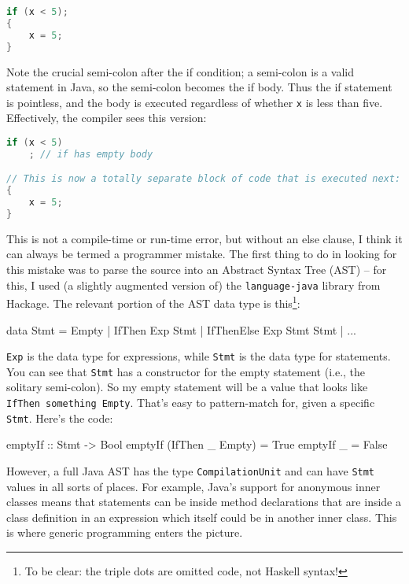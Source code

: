 \documentclass{tmr}
\begin{document}
\begin{lstlisting}[language=java]
if (x < 5);
{
    x = 5;
}
\end{lstlisting}

Note the crucial semi-colon after the if condition; a semi-colon is a valid statement in Java, so the semi-colon becomes the if body.  Thus the if statement is pointless, and the body is executed regardless of whether \lstinline|x| is less than five.  Effectively, the compiler sees this version:

\begin{lstlisting}[language=java]
if (x < 5)
    ; // if has empty body

// This is now a totally separate block of code that is executed next:
{
    x = 5;
}
\end{lstlisting}

This is not a compile-time or run-time error, but without an else clause, I think it can always be termed a programmer mistake.  The first thing to do in looking for this mistake was to parse the source into an Abstract Syntax Tree (AST) -- for this, I used (a slightly augmented version of) the \texttt{language-java} library from Hackage.  The relevant portion of the AST data type is this\footnote{To be clear: the triple dots are omitted code, not Haskell syntax!}:

\begin{code}
data Stmt = Empty | IfThen Exp Stmt | IfThenElse Exp Stmt Stmt | ...
\end{code}

\lstinline|Exp| is the data type for expressions, while \lstinline|Stmt| is the data type for statements.  You can see that \lstinline|Stmt| has a constructor for the empty statement (i.e., the solitary semi-colon).  So my empty statement will be a value that looks like \lstinline|IfThen something Empty|.  That's easy to pattern-match for, given a specific \lstinline|Stmt|.  Here's the code:

\begin{code}
emptyIf :: Stmt -> Bool
emptyIf (IfThen _ Empty) = True
emptyIf _ = False
\end{code}

However, a full Java AST has the type \lstinline|CompilationUnit| and can have \lstinline|Stmt| values in all sorts of places. For example, Java's support for anonymous inner classes means that statements can be inside method declarations that are inside a class definition in an expression which itself could be in another inner class.  This is where generic programming enters the picture.
\end{document}
